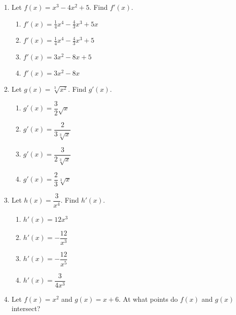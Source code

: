 \documentclass{article}
\begin{document}
\begin{enumerate}



\item Let $f(x)=x^3-4x^2+5$. Find $f'(x)$.

  \begin{enumerate}
  
 
  \item $f'(x) = \frac{1}{4}x^4-\frac{4}{3}x^3+5x$ %
  \item $f'(x) = \frac{1}{4}x^4-\frac{4}{3}x^3+5$ 
  \item $f'(x) = 3x^2-8x +5$ %
  \item $f'(x) = 3x^2-8x$ %
  \end{enumerate}



\item Let $g(x)=\sqrt[3]{x^2}$. Find $g'(x)$.

  \begin{enumerate}
  
  
  \item $g'(x) = \dfrac{3}{2}\sqrt{x}$ %
  \item $g'(x) = \dfrac{2}{3\sqrt[3]{x}}$ %
  \item $g'(x) = \dfrac{3}{2\sqrt[3]{x}}$ %
  \item $g'(x) = \dfrac{2}{3}\sqrt[3]{x}$
  
  
  \end{enumerate}

\item Let $h(x)=\dfrac{3}{x^4}$. Find $h'(x)$.

  \begin{enumerate}
  \item $h'(x) = 12x^3$ %
  \item $h'(x) = -\dfrac{12}{x^3}$ %
  \item $h'(x) = -\dfrac{12}{x^5}$ %
  \item $h'(x) = \dfrac{3}{4x^3}$ %
  
  \end{enumerate}



\item Let $f(x)=x^2$ and $g(x)=x+6$. At what points do $f(x)$ and $g(x)$ intersect? 


\end{enumerate}
\end{document}
